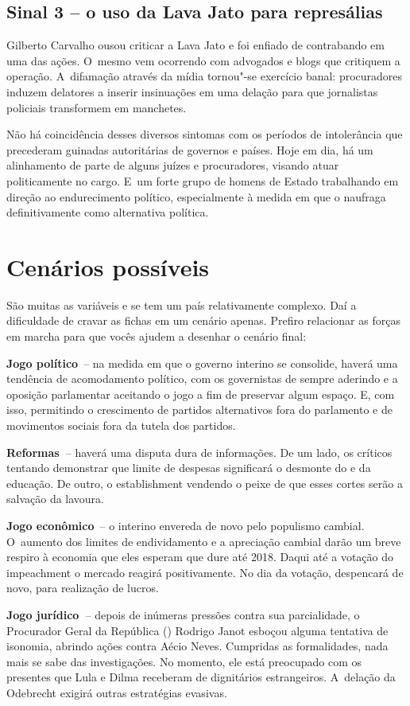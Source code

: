 \subsection{Sinal 3 -- o uso da Lava Jato para represálias}

Gilberto Carvalho ousou criticar a Lava Jato e foi enfiado de
contrabando em uma das ações. O~mesmo vem ocorrendo com advogados e
blogs que critiquem a operação. A~difamação através da mídia tornou"-se
exercício banal: procuradores induzem delatores a inserir insinuações em
uma delação para que jornalistas policiais transformem em manchetes.

Não há coincidência desses diversos sintomas com os períodos de
intolerância que precederam guinadas autoritárias de governos e países.
Hoje em dia, há um alinhamento de parte de alguns juízes e procuradores,
visando atuar politicamente no cargo. E~um forte grupo de homens de
Estado trabalhando em direção ao endurecimento político, especialmente à
medida em que o  naufraga definitivamente como alternativa política.

\section{Cenários possíveis}

São muitas as variáveis e se tem um país relativamente complexo. Daí a
dificuldade de cravar as fichas em um cenário apenas. Prefiro relacionar
as forças em marcha para que vocês ajudem a desenhar o cenário final:

\textbf{Jogo político}~-- na medida em que o governo interino se
consolide, haverá uma tendência de acomodamento político, com os
governistas de sempre aderindo e a oposição parlamentar aceitando o jogo
a fim de preservar algum espaço. E, com isso, permitindo o crescimento
de partidos alternativos fora do parlamento e de movimentos sociais fora
da tutela dos partidos.

\textbf{Reformas~}-- haverá uma disputa dura de informações. De um lado,
os críticos tentando demonstrar que limite de despesas significará o
desmonte do  e da educação. De outro, o establishment vendendo o
peixe de que esses cortes serão a salvação da lavoura.

\textbf{Jogo econômico}~-- o interino envereda de novo pelo populismo
cambial. O~aumento dos limites de endividamento e a apreciação cambial
darão um breve respiro à economia que eles esperam que dure até 2018.
Daqui até a votação do impeachment o mercado reagirá positivamente. No
dia da votação, despencará de novo, para realização de lucros.

\textbf{Jogo jurídico~}-- depois de inúmeras pressões contra sua
parcialidade, o Procurador Geral da República () Rodrigo Janot
esboçou alguma tentativa de isonomia, abrindo ações contra Aécio Neves.
Cumpridas as formalidades, nada mais se sabe das investigações. No
momento, ele está preocupado com os presentes que Lula e Dilma receberam
de dignitários estrangeiros. A~delação da Odebrecht exigirá outras
estratégias evasivas.
